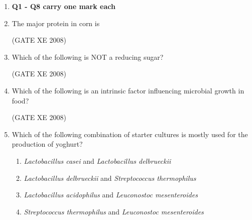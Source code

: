 \documentclass[12pt]{article}
\begin{document}
\begin{enumerate}
\item[] \textbf{Q1 - Q8 carry one mark each}



    \item The major protein in corn is
\begin{enumerate}
\end{enumerate}
    
    (GATE XE 2008)

    \item Which of the following is NOT a reducing sugar? 
\begin{enumerate}
\end{enumerate}
    
    (GATE XE 2008)

    \item Which of the following is an intrinsic factor influencing microbial growth in food? 

\begin{enumerate}
\end{enumerate}
    
    (GATE XE 2008)

    \item Which of the following combination of starter cultures is mostly used for the production of yoghurt? 

\begin{enumerate}
    \item  \textit{Lactobacillus casei} and \textit{Lactobacillus delbrueckii} 
    \item  \textit{Lactobacillus delbrueckii} and \textit{Streptococcus thermophilus} 
    \item  \textit{Lactobacillus acidophilus} and \textit{Leuconostoc mesenteroides} 
    \item  \textit{Streptococcus thermophilus} and \textit{Leuconostoc mesenteroides} 
\end{enumerate}
    

\end{enumerate}
\end{document}
